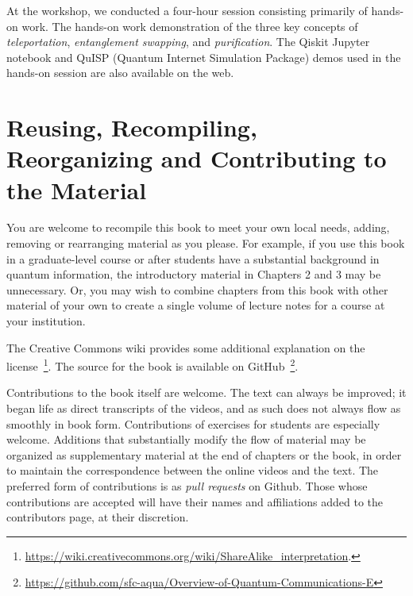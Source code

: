At the workshop, we conducted a four-hour session consisting primarily of hands-on work.  The hands-on work demonstration of the three key concepts of \emph{teleportation}, \emph{entanglement swapping}, and \emph{purification}. The Qiskit Jupyter notebook and QuISP (Quantum Internet Simulation Package) demos used in the hands-on session are also available on the web. 

\section*{Reusing, Recompiling, Reorganizing and Contributing to the Material}

You are welcome to recompile this book to meet your own local needs, adding, removing or rearranging material as you please. For example, if you use this book in a graduate-level course or after students have a substantial background in quantum information, the introductory material in Chapters 2 and 3 may be unnecessary. Or, you may wish to combine chapters from this book with other material of your own to create a single volume of lecture notes for a course at your institution.

The Creative Commons wiki provides some additional explanation on the license~\footnote{\url{https://wiki.creativecommons.org/wiki/ShareAlike_interpretation}.}.  The source for the book is available on GitHub~\footnote{\url{https://github.com/sfc-aqua/Overview-of-Quantum-Communications-E}}. 

Contributions to the book itself are welcome.  The text can always be improved; it began life as direct transcripts of the videos, and as such does not always flow as smoothly in book form.  Contributions of exercises for students are especially welcome.  Additions that substantially modify the flow of material may be organized as supplementary material at the end of chapters or the book, in order to maintain the correspondence between the online videos and the text.  The preferred form of contributions is as \emph{pull requests} on Github.  Those whose contributions are accepted will have their names and affiliations added to the contributors page, at their discretion.
